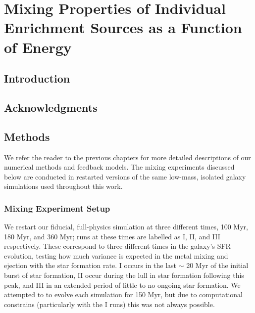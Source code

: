 \chapter[Mixing Properties of Individual Enrichment Sources as a Function of Energy]{Mixing Properties of Individual Enrichment Sources as a Function of Energy\label{ch:chapter4}}
\let\thefootnote\relax{}

%
%

\section{Introduction}

\section*{Acknowledgments}

\section{Methods}
\label{ch4:sec:methods}
We refer the reader to the previous chapters for more detailed descriptions of our numerical methods and feedback models. The mixing experiments discussed below are conducted in restarted versions of the same low-mass, isolated galaxy simulations used throughout this work.




\subsection{Mixing Experiment Setup}
\label{ch4:sec:experiment}
We restart our fiducial, full-physics simulation at three different times, 100 Myr, 180 Myr, and 360 Myr; runs at these times are labelled as I, II, and III respectively. These correspond to three different times in the galaxy's SFR evolution, testing how much variance is expected in the metal mixing and ejection with the star formation rate. I occurs in the last $\sim$ 20 Myr of the initial burst of star formation, II occur during the lull in star formation following this peak, and III in an extended period of little to no ongoing star formation. We attempted to to evolve each simulation for 150 Myr, but due to computational constrains (particularly with the I runs) this was not always possible.

